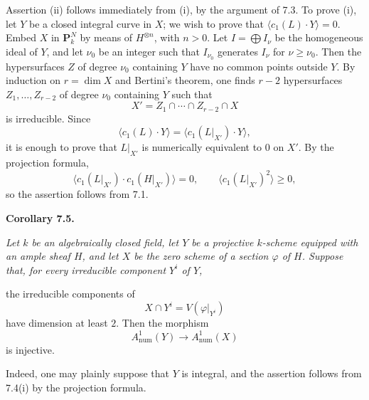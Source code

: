 Assertion (ii) follows immediately from (i), by the argument of 7.3. To prove (i), let $Y$ be a closed integral curve in $X$; we wish to prove that $\langle c_1(L)\cdot Y\rangle=0$. Embed $X$ in $\mathbf P^N_k$ by means of $H^{\otimes n}$, with $n>0$. Let $I=\bigoplus I_\nu$ be the homogeneous ideal of $Y$, and let $\nu_0$ be an integer such that $I_{\nu_0}$ generates $I_\nu$ for $\nu\geq\nu_0$. Then the hypersurfaces $Z$ of degree $\nu_0$ containing $Y$ have no common points outside $Y$. By induction on $r=\dim X$ and Bertini's theorem, one finds $r-2$ hypersurfaces $Z_1,\ldots,Z_{r-2}$ of degree $\nu_0$ containing $Y$ such that
\[
  X'=Z_1\cap\cdots\cap Z_{r-2}\cap X
\]
is irreducible. Since
\[
  \langle c_1(L)\cdot Y\rangle
  =\langle c_1(L|_{X'})\cdot Y\rangle,
\]
it is enough to prove that $L|_{X'}$ is numerically equivalent to $0$ on $X'$. By the projection formula,
\[
  \langle c_1(L|_{X'})\cdot c_1(H|_{X'})\rangle=0,
  \qquad
  \langle c_1(L|_{X'})^2\rangle\geq0,
\]
so the assertion follows from 7.1.

\textbf{Corollary 7.5.} {\itshape Let $k$ be an algebraically closed field, let $Y$ be a projective $k$-scheme equipped with an ample sheaf $H$, and let $X$ be the zero scheme of a section $\varphi$ of $H$. Suppose that, for every irreducible component $Y^i$ of $Y$,

the irreducible components of
\[
  X\cap Y^i=V(\varphi|_{Y^i})
\]
have dimension at least $2$. Then the morphism
\[
  A^1_{\mathrm{num}}(Y)\longrightarrow A^1_{\mathrm{num}}(X)
\]
is injective.\par}

Indeed, one may plainly suppose that $Y$ is integral, and the assertion follows from 7.4(i) by the projection formula.

